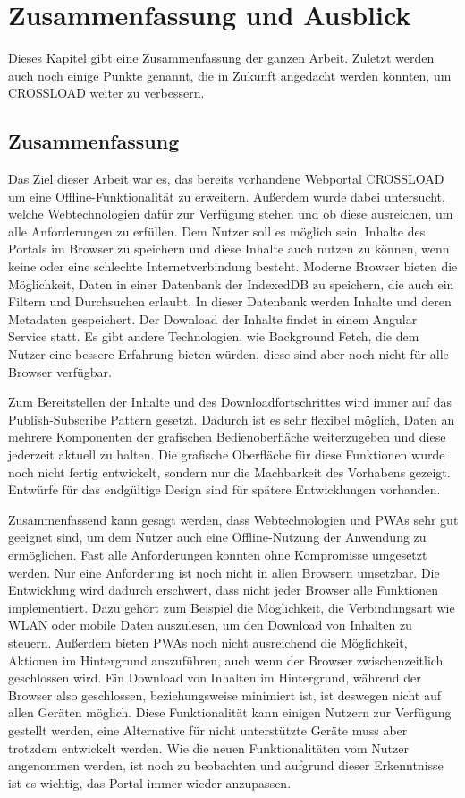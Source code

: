\chapter{Zusammenfassung und Ausblick}
\label{Kap7}
Dieses Kapitel gibt eine Zusammenfassung der ganzen Arbeit. Zuletzt werden auch noch einige Punkte genannt, die in Zukunft angedacht werden könnten, um CROSSLOAD weiter zu verbessern.

\section{Zusammenfassung}
Das Ziel dieser Arbeit war es, das bereits vorhandene Webportal CROSSLOAD um eine Offline-Funktionalität zu erweitern. Außerdem wurde dabei untersucht, welche Webtechnologien dafür zur Verfügung stehen und ob diese ausreichen, um alle Anforderungen zu erfüllen. Dem Nutzer soll es möglich sein, Inhalte des Portals im Browser zu speichern und diese Inhalte auch nutzen zu können, wenn keine oder eine schlechte Internetverbindung besteht. Moderne Browser bieten die Möglichkeit, Daten in einer Datenbank der IndexedDB zu speichern, die auch ein Filtern und Durchsuchen erlaubt. In dieser Datenbank werden Inhalte und deren Metadaten gespeichert. Der Download der Inhalte findet in einem Angular Service statt. Es gibt andere Technologien, wie Background Fetch, die dem Nutzer eine bessere Erfahrung bieten würden, diese sind aber noch nicht für alle Browser verfügbar. 

Zum Bereitstellen der Inhalte und des Downloadfortschrittes wird immer auf das Publish-Subscribe Pattern gesetzt. Dadurch ist es sehr flexibel möglich, Daten an mehrere Komponenten der grafischen Bedienoberfläche weiterzugeben und diese jederzeit aktuell zu halten. Die grafische Oberfläche für diese Funktionen wurde noch nicht fertig entwickelt, sondern nur die Machbarkeit des Vorhabens gezeigt. Entwürfe für das endgültige Design sind für spätere Entwicklungen vorhanden. 

Zusammenfassend kann gesagt werden, dass Webtechnologien und \acp{PWA} sehr gut geeignet sind, um dem Nutzer auch eine Offline-Nutzung der Anwendung zu ermöglichen. Fast alle Anforderungen konnten ohne Kompromisse umgesetzt werden. Nur eine Anforderung ist noch nicht in allen Browsern umsetzbar. Die Entwicklung wird dadurch erschwert, dass nicht jeder Browser alle Funktionen implementiert. Dazu gehört zum Beispiel die Möglichkeit, die Verbindungsart wie WLAN oder mobile Daten auszulesen, um den Download von Inhalten zu steuern. Außerdem bieten \acp{PWA} noch nicht ausreichend die Möglichkeit, Aktionen im Hintergrund auszuführen, auch wenn der Browser zwischenzeitlich geschlossen wird. Ein Download von Inhalten im Hintergrund, während der Browser also geschlossen, beziehungsweise minimiert ist, ist deswegen nicht auf allen Geräten möglich. Diese Funktionalität kann einigen Nutzern zur Verfügung gestellt werden, eine Alternative für nicht unterstützte Geräte muss aber trotzdem entwickelt werden. Wie die neuen Funktionalitäten vom Nutzer angenommen werden, ist noch zu beobachten und aufgrund dieser Erkenntnisse ist es wichtig, das Portal immer wieder anzupassen.

